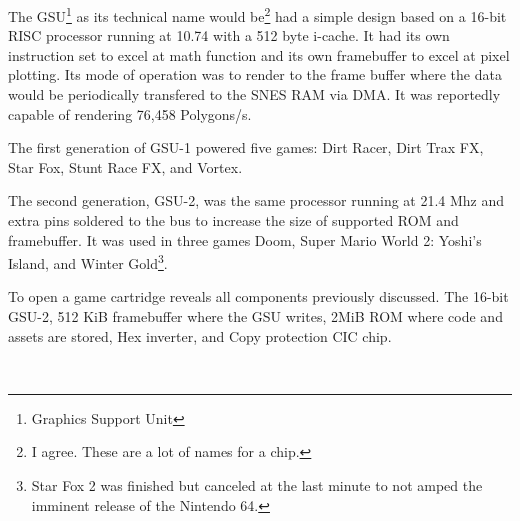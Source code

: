 \par
The GSU\footnote{Graphics Support Unit} as its technical name would be\footnote{I agree. These are a lot of names for a chip.} had a simple design based on a 16-bit RISC processor running at 10.74 with a 512 byte i-cache. It had its own instruction set to excel at math function and its own framebuffer to excel at pixel plotting. Its mode of operation was to render to the frame buffer where the data would be periodically transfered to the SNES RAM via DMA. It was reportedly capable of rendering 76,458 Polygons/s.\\

\par
The first generation of GSU-1 powered five games: Dirt Racer, Dirt Trax FX, Star Fox, Stunt Race FX, and Vortex.\\
\par
 The second generation, GSU-2, was the same processor running at 21.4 Mhz and extra pins soldered to the bus to increase the size of supported ROM and framebuffer. It was used in three games Doom, Super Mario World 2: Yoshi's Island, and Winter Gold\footnote{Star Fox 2 was finished but canceled at the last minute to not amped the imminent release of the Nintendo 64.}.\\
\par
To open a \doom{} game cartridge reveals all components previously discussed.  The 16-bit GSU-2,  512 KiB framebuffer where the GSU writes,  2MiB ROM where code and assets are stored,  Hex inverter, and  Copy protection CIC chip.







\\
\par

